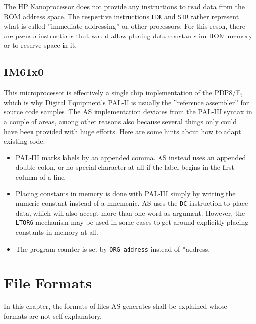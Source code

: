 \documentclass[12pt,twoside]{report}
\newcommand{\tty}[1]{{\tt #1}}
\newcommand{\asname}{{AS}}
\begin{document}
The HP Nanoprocessor does not provide any instructions to read data from the ROM
address space.  The respective instructions {\tt LDR} and {\tt STR} rather
represent what is called ''immediate addressing'' on other processors.  For this
reson, there are pseudo instructions that would allow placing data constants
im ROM memory or to reserve space in it.


\section{IM61x0}

This microprocessor is effectively a single chip implementation of the PDP8/E,
which is why Digital Equipment's PAL-II is usually the ''reference assembler''
for source code samples.  The \asname{} implementation deviates from the PAL-III syntax
in a couple of areas, among other reasons also because several things only
could have been provided with huge efforts.  Here are some hints about how to
adapt existing code:

\begin{itemize}
\item{PAL-III marks labels by an appended comma.  \asname{} instead uses an appended
      double colon, or no special character at all if the label begins in the
      first column of a line.}
\item{Placing constants in memory is done with PAL-III simply by writing the
      numeric constant instead of a mnemonic.  \asname{} uses the \tty{DC} instruction
      to place data, which will also accept more than one word as argument.
      However, the \tty{LTORG} mechanism may be used in some cases to get
      around explicitly placing constants in memory at all.}
\item{The program counter is set by \tty{ORG address} instead of {*address}.}
\end{itemize}


\cleardoublepage
\chapter{File Formats}

In this chapter, the formats of files \asname{} generates shall be explained
whose formats are not self-explanatory.
\end{document}
